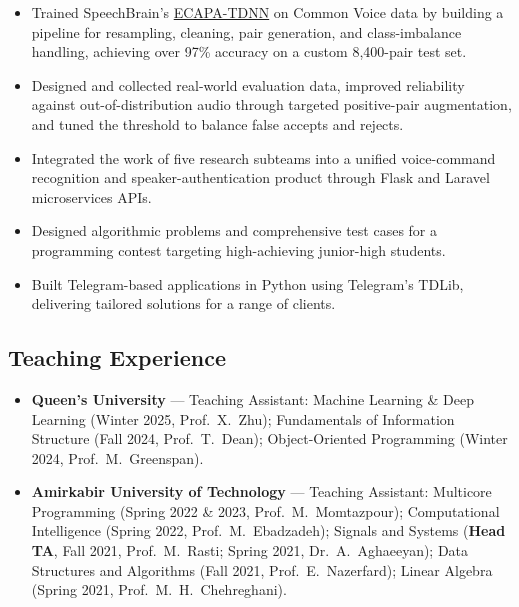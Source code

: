\documentclass[11pt,letterpaper]{article}
\begin{document}
\begin{itemize}
  \item Trained SpeechBrain’s \href{https://arxiv.org/abs/2104.01466}{ECAPA-TDNN} on Common Voice data by building a pipeline for resampling, cleaning, pair generation, and class-imbalance handling, achieving over 97\% accuracy on a custom 8,400-pair test set.
  \item Designed and collected real-world evaluation data, improved reliability against out-of-distribution audio through targeted positive-pair augmentation, and tuned the threshold to balance false accepts and rejects.
  \item Integrated the work of five research subteams into a unified voice-command recognition and speaker-authentication product through Flask and Laravel microservices APIs.
\end{itemize}

\begin{itemize}
  \item Designed algorithmic problems and comprehensive test cases for a programming contest targeting high-achieving junior-high students.
\end{itemize}

\begin{itemize}
  \item Built Telegram-based applications in Python using Telegram's TDLib, delivering tailored solutions for a range of clients.
\end{itemize}

\subsection*{Teaching Experience}
\begin{itemize}
  \item \textbf{Queen's University} --- Teaching Assistant: Machine Learning \& Deep Learning (Winter 2025, Prof.\ X.\ Zhu); Fundamentals of Information Structure (Fall 2024, Prof.\ T.\ Dean); Object-Oriented Programming (Winter 2024, Prof.\ M.\ Greenspan).
  \item \textbf{Amirkabir University of Technology} --- Teaching Assistant: Multicore Programming (Spring 2022 \& 2023, Prof.\ M.\ Momtazpour); Computational Intelligence (Spring 2022, Prof.\ M.\ Ebadzadeh); Signals and Systems (\textbf{Head TA}, Fall 2021, Prof.\ M.\ Rasti; Spring 2021, Dr.\ A.\ Aghaeeyan); Data Structures and Algorithms (Fall 2021, Prof.\ E.\ Nazerfard); Linear Algebra (Spring 2021, Prof.\ M.\ H.\ Chehreghani).
\end{itemize}
\end{document}
